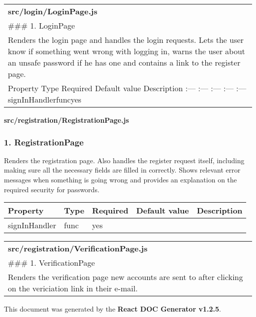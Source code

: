 \begin{longtable}[]{@{}l@{}}
\toprule
\endhead
\begin{minipage}[t]{0.08\columnwidth}\raggedright
\textbf{src/login/LoginPage.js}\strut
\end{minipage}\tabularnewline
\begin{minipage}[t]{0.08\columnwidth}\raggedright
\#\#\# 1. LoginPage\strut
\end{minipage}\tabularnewline
\begin{minipage}[t]{0.08\columnwidth}\raggedright
Renders the login page and handles the login requests. Lets the user
know if something went wrong with logging in, warns the user about an
unsafe password if he has one and contains a link to the register
page.\strut
\end{minipage}\tabularnewline
\begin{minipage}[t]{0.08\columnwidth}\raggedright
Property \textbar{} Type \textbar{} Required \textbar{} Default value
\textbar{} Description :--- \textbar{} :--- \textbar{} :--- \textbar{}
:--- \textbar{} :---
signInHandler\textbar{}func\textbar{}yes\textbar{}\textbar{}\strut
\end{minipage}\tabularnewline
\bottomrule
\end{longtable}

\textbf{src/registration/RegistrationPage.js}

\hypertarget{registrationpage}{%
\subsubsection{1. RegistrationPage}\label{registrationpage}}

Renders the registration page. Also handles the register request itself,
including making sure all the necessary fields are filled in correctly.
Shows relevant error messages when something is going wrong and provides
an explanation on the required security for passwords.

\begin{longtable}[]{@{}lllll@{}}
\toprule
Property & Type & Required & Default value & Description\tabularnewline
\midrule
\endhead
signInHandler & func & yes & &\tabularnewline
\bottomrule
\end{longtable}

\begin{longtable}[]{@{}l@{}}
\toprule
\endhead
\begin{minipage}[t]{0.08\columnwidth}\raggedright
\textbf{src/registration/VerificationPage.js}\strut
\end{minipage}\tabularnewline
\begin{minipage}[t]{0.08\columnwidth}\raggedright
\#\#\# 1. VerificationPage\strut
\end{minipage}\tabularnewline
\begin{minipage}[t]{0.08\columnwidth}\raggedright
Renders the verification page new accounts are sent to after clicking on
the vericiation link in their e-mail.\strut
\end{minipage}\tabularnewline
\bottomrule
\end{longtable}

This document was generated by the \textbf{React DOC Generator v1.2.5}.
